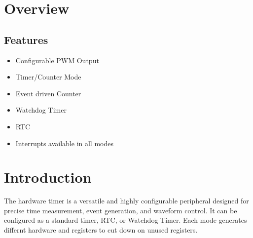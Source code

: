 \section{Overview}

\subsection{Features}
\begin{itemize}
    \item Configurable PWM Output
    \item Timer/Counter Mode
    \item Event driven Counter
    \item Watchdog Timer
    \item RTC
    \item Interrupts available in all modes
\end{itemize}

\section{Introduction}
The hardware timer is a versatile and highly configurable peripheral designed for precise time 
measurement, event generation, and waveform control. It can be configured as a standard timer, 
RTC, or Watchdog Timer. Each mode generates differnt hardware and registers to cut down on unused registers.
